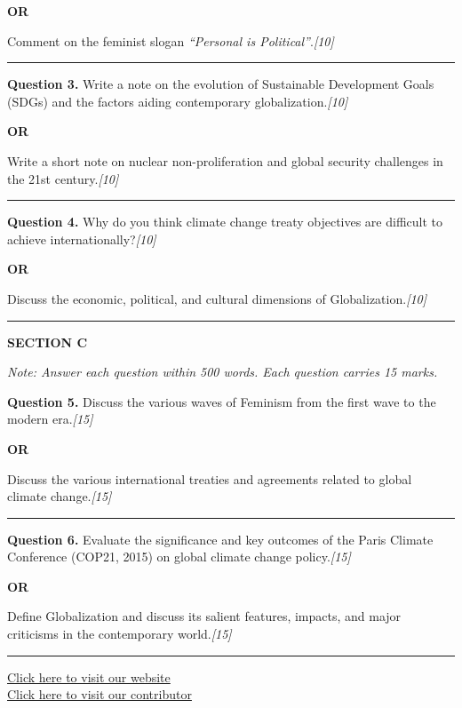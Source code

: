 \documentclass[11pt,a4paper]{article}
\newcommand{\pts}[1]{\hfill   \textit{[#1]}}
\begin{document}
\centerline{   \textbf{OR}}




\noindent Comment on the feminist slogan   \textit{``Personal is Political''}.\pts{10}

\medskip\rule{\linewidth}{0.1pt}\medskip




\noindent   \textbf{Question 3.} Write a note on the evolution of Sustainable Development Goals (SDGs) and the factors aiding contemporary globalization.\pts{10}

\centerline{   \textbf{OR}}




\noindent Write a short note on nuclear non-proliferation and global security challenges in the 21st century.\pts{10}

\medskip\rule{\linewidth}{0.1pt}\medskip




\noindent   \textbf{Question 4.} Why do you think climate change treaty objectives are difficult to achieve internationally?\pts{10}

\centerline{   \textbf{OR}}




\noindent Discuss the economic, political, and cultural dimensions of Globalization.\pts{10}

\bigskip
\rule{\linewidth}{0.2pt}
\medskip

\centerline{   \textbf{SECTION C}}
\smallskip



\noindent   \textit{Note: Answer each question within 500 words. Each question carries 15 marks.}

\bigskip




\noindent   \textbf{Question 5.} Discuss the various waves of Feminism from the first wave to the modern era.\pts{15}

\centerline{   \textbf{OR}}




\noindent Discuss the various international treaties and agreements related to global climate change.\pts{15}

\medskip\rule{\linewidth}{0.1pt}\medskip




\noindent   \textbf{Question 6.} Evaluate the significance and key outcomes of the Paris Climate Conference (COP21, 2015) on global climate change policy.\pts{15}

\centerline{   \textbf{OR}}




\noindent Define Globalization and discuss its salient features, impacts, and major criticisms in the contemporary world.\pts{15}

\vfill
\rule{\linewidth}{0.4pt}

\begin{center}\small
\href{https://bhu-exam.vercel.app/}{Click here to visit our website}\\[4pt]
\href{https://me-aryan.vercel.app/}{Click here to visit our contributor}
\end{center}
\end{document}
